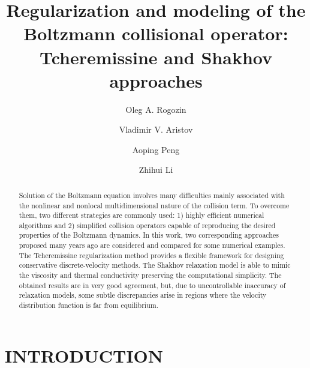 \documentclass{aip-cp}
\begin{document}
\title{Regularization and modeling of the Boltzmann collisional operator:
    Tcheremissine and Shakhov approaches}

\author[aff1,aff2]{Oleg A. Rogozin}
\author[aff2]{Vladimir V. Aristov}
\author[aff3,aff4]{Aoping Peng}
\author[aff3,aff4]{Zhihui Li}


\maketitle

\begin{abstract}
Solution of the Boltzmann equation involves many difficulties
mainly associated with the nonlinear and nonlocal multidimensional nature of the collision term.
To overcome them, two different strategies are commonly used:
1) highly efficient numerical algorithms
and 2) simplified collision operators capable of reproducing the desired properties of the Boltzmann dynamics.
In this work, two corresponding approaches proposed many years ago are considered and compared for some numerical examples.
The Tcheremissine regularization method provides a flexible framework for designing conservative discrete-velocity methods.
The Shakhov relaxation model is able to mimic the viscosity and thermal conductivity preserving the computational simplicity.
The obtained results are in very good agreement, but, due to uncontrollable inaccuracy of relaxation models,
some subtle discrepancies arise in regions where the velocity distribution function is far from equilibrium.
\end{abstract}

\section{INTRODUCTION}
\end{document}
